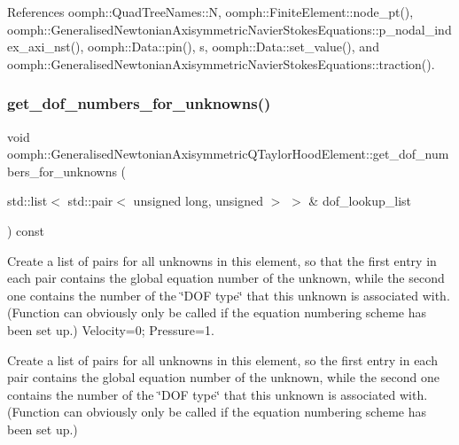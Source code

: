 References oomph\+::\+Quad\+Tree\+Names\+::N, oomph\+::\+Finite\+Element\+::node\+\_\+pt(), oomph\+::\+Generalised\+Newtonian\+Axisymmetric\+Navier\+Stokes\+Equations\+::p\+\_\+nodal\+\_\+index\+\_\+axi\+\_\+nst(), oomph\+::\+Data\+::pin(), s, oomph\+::\+Data\+::set\+\_\+value(), and oomph\+::\+Generalised\+Newtonian\+Axisymmetric\+Navier\+Stokes\+Equations\+::traction().

\mbox{\label{classoomph_1_1GeneralisedNewtonianAxisymmetricQTaylorHoodElement_a88d4fad547ca6ad754563bc7f1ecf34f}} 
\subsubsection{\texorpdfstring{get\+\_\+dof\+\_\+numbers\+\_\+for\+\_\+unknowns()}{get\_dof\_numbers\_for\_unknowns()}}
{\footnotesize\ttfamily void oomph\+::\+Generalised\+Newtonian\+Axisymmetric\+Q\+Taylor\+Hood\+Element\+::get\+\_\+dof\+\_\+numbers\+\_\+for\+\_\+unknowns (\begin{DoxyParamCaption}\item[{std\+::list$<$ std\+::pair$<$ unsigned long, unsigned $>$ $>$ \&}]{dof\+\_\+lookup\+\_\+list }\end{DoxyParamCaption}) const\hspace{0.3cm}{\ttfamily [virtual]}}



Create a list of pairs for all unknowns in this element, so that the first entry in each pair contains the global equation number of the unknown, while the second one contains the number of the \char`\"{}\+D\+O\+F type\char`\"{} that this unknown is associated with. (Function can obviously only be called if the equation numbering scheme has been set up.) Velocity=0; Pressure=1. 

Create a list of pairs for all unknowns in this element, so the first entry in each pair contains the global equation number of the unknown, while the second one contains the number of the \char`\"{}\+D\+O\+F type\char`\"{} that this unknown is associated with. (Function can obviously only be called if the equation numbering scheme has been set up.) 

